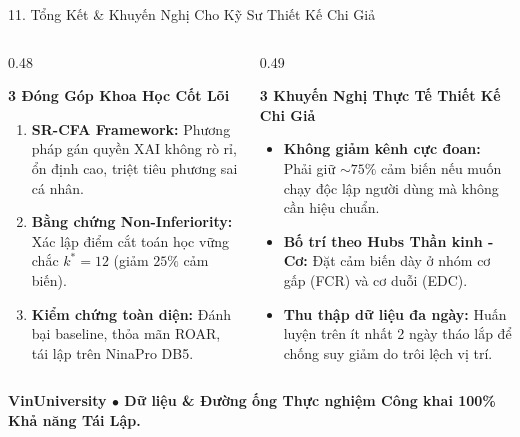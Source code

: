 \documentclass[aspectratio=169,10pt]{beamer}
\begin{document}
\begin{frame}{11. Tổng Kết \& Khuyến Nghị Cho Kỹ Sư Thiết Kế Chi Giả}
    \begin{columns}[T]
        \begin{column}{0.48\textwidth}
            \begin{block}{\textbf{3 Đóng Góp Khoa Học Cốt Lõi}}
                \footnotesize
                \begin{enumerate}
                    \item \textbf{SR-CFA Framework:} Phương pháp gán quyền XAI không rò rỉ, ổn định cao, triệt tiêu phương sai cá nhân.
                    \item \textbf{Bằng chứng Non-Inferiority:} Xác lập điểm cắt toán học vững chắc $k^*=12$ (giảm $25\%$ cảm biến).
                    \item \textbf{Kiểm chứng toàn diện:} Đánh bại baseline, thỏa mãn ROAR, tái lập trên NinaPro DB5.
                \end{enumerate}
            \end{block}
        \end{column}
        
        \begin{column}{0.49\textwidth}
            \begin{exampleblock}{\textbf{3 Khuyến Nghị Thực Tế Thiết Kế Chi Giả}}
                \footnotesize
                \begin{itemize}
                    \item \textbf{Không giảm kênh cực đoan:} Phải giữ $\sim 75\%$ cảm biến nếu muốn chạy độc lập người dùng mà không cần hiệu chuẩn.
                    \item \textbf{Bố trí theo Hubs Thần kinh - Cơ:} Đặt cảm biến dày ở nhóm cơ gấp (FCR) và cơ duỗi (EDC).
                    \item \textbf{Thu thập dữ liệu đa ngày:} Huấn luyện trên ít nhất 2 ngày tháo lắp để chống suy giảm do trôi lệch vị trí.
                \end{itemize}
            \end{exampleblock}
        \end{column}
    \end{columns}
    
    \vspace{0.25cm}
    \begin{center}
        \footnotesize \textbf{\textcolor{vinNavy}{VinUniversity $\bullet$ Dữ liệu \& Đường ống Thực nghiệm Công khai 100\% Khả năng Tái Lập.}}
    \end{center}
\end{frame}
\end{document}
